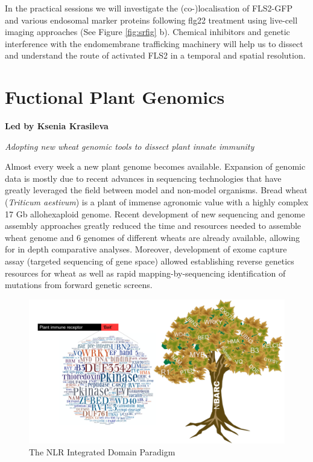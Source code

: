 \documentclass[12pt,]{book}
\theoremstyle{definition}
\theoremstyle{definition}
\theoremstyle{remark}
\begin{document}
In the practical sessions we will investigate the (co-)localisation of
FLS2-GFP and various endosomal marker proteins following flg22 treatment
using live-cell imaging approaches (See Figure \ref{fig:srfig} b).
Chemical inhibitors and genetic interference with the endomembrane
trafficking machinery will help us to dissect and understand the route
of activated FLS2 in a temporal and spatial resolution.

\chapter*{Fuctional Plant Genomics}\label{fuctional-plant-genomics}

\textbf{Led by Ksenia Krasileva}

\emph{Adopting new wheat genomic tools to dissect plant innate immunity}

Almost every week a new plant genome becomes available. Expansion of
genomic data is mostly due to recent advances in sequencing technologies
that have greatly leveraged the field between model and non-model
organisms. Bread wheat (\emph{Triticum aestivum}) is a plant of immense
agronomic value with a highly complex 17 Gb allohexaploid genome. Recent
development of new sequencing and genome assembly approaches greatly
reduced the time and resources needed to assemble wheat genome and 6
genomes of different wheats are already available, allowing for in depth
comparative analyses. Moreover, development of exome capture assay
(targeted sequencing of gene space) allowed establishing reverse
genetics resources for wheat as well as rapid mapping-by-sequencing
identification of mutations from forward genetic screens.

\begin{figure}[htbp]
\centering
\includegraphics{assets/kk_fig1.pdf}
\caption{\label{fig:mainwg}The NLR Integrated Domain Paradigm}
\end{figure}
\end{document}
